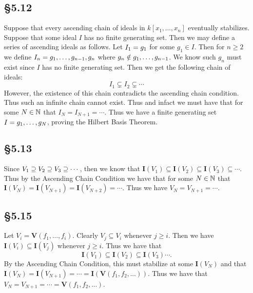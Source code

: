 \documentclass[letterpaper]{article}
\begin{document}
\subsection*{\S 5.12}

Suppose that every ascending chain of ideals in $k[x_{1}, \ldots, x_{n}]$ eventually stabilizes.
Suppose that some ideal $I$ has no finite generating set.
Then we may define a series of ascending ideals as follows.
Let $I_{1} = \gen{g_{1}}$ for some $g_{1} \in I$.
Then for $n \geq 2$ we define $I_{n} = \gen{g_{1}, \ldots, g_{n - 1}, g_{n}}$ where $g_{n} \notin \gen{g_{1}, \ldots, g_{n - 1}}$.
We know such $g_{n}$ must exist since $I$ has no finite generating set.
Then we get the following chain of ideals:
\[
  I_{1} \subsetneq I_{2} \subsetneq \cdots
\]
However, the existence of this chain contradicts the ascending chain condition.
Thus such an infinite chain cannot exist.
Thus and infact we must have that for some $N \in \mathbb{N}$ that $I_{N} = I_{N + 1} = \cdots$.
Thus we have a finite generating set $I = \gen{g_{1}, \ldots, g_{N}}$, proving the Hilbert Basis Theorem.

\subsection*{\S 5.13}

Since $V_{1} \supseteq V_{2} \supseteq V_{3} \supseteq \cdots$, then we know that $\mathbf{I}(V_{1}) \subseteq \mathbf{I}(V_{2}) \subseteq \mathbf{I}(V_{3}) \subseteq \cdots$.
Thus by the Ascending Chain Condition we have that for some $N \in \mathbb{N}$ that $\mathbf{I}(V_{N}) = \mathbf{I}(V_{N + 1}) = \mathbf{I}(V_{N + 2}) = \cdots$.
Thus we have $V_{N} = V_{N + 1} = \cdots$.

\subsection*{\S 5.15}

Let $V_{i} = \textbf{V}(f_{1}, \ldots, f_{i})$.
Clearly $V_{j} \subseteq V_{i}$ whenever $j \geq i$.
Then we have $\mathbf{I}(V_{i}) \subseteq \mathbf{I}(V_{j})$ whenever $j \geq i$.
Thus we have that
\[
  \mathbf{I}(V_{1}) \subseteq \mathbf{I}(V_{2}) \subseteq \mathbf{I}(V_{3}) \cdots.
\]
By the Ascending Chain Condition, this must stabilize at some $\mathbf{I}(V_{N})$ and that $\mathbf{I}(V_{N}) = \mathbf{I}(V_{N + 1}) = \cdots = \mathbf{I}(\textbf{V}(f_{1}, f_{2}, \ldots))$.
Thus we have that $V_{N} = V_{N + 1} = \cdots = \textbf{V}(f_{1}, f_{2}, \ldots)$.
\end{document}
